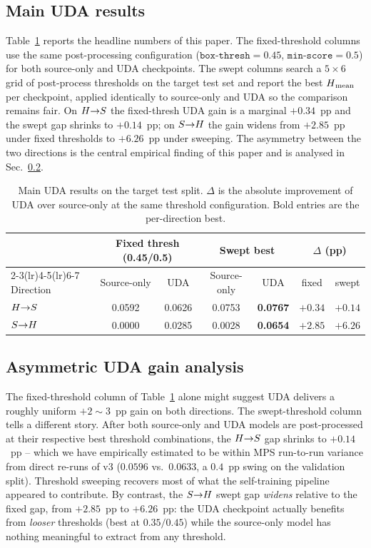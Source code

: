 \subsection{Main UDA results}
\label{sec:exp:main}
Table~\ref{tab:main} reports the headline numbers of this paper.
The fixed-threshold columns use the same post-processing configuration
($\texttt{box-thresh}=0.45$, $\texttt{min-score}=0.5$) for both
source-only and UDA checkpoints. The swept columns search a
$5\times 6$ grid of post-process thresholds on the target test set
and report the best $H\textsubscript{mean}$ per checkpoint, applied identically to
source-only and UDA so the comparison remains fair. On $H{\rightarrow}S$
the fixed-thresh UDA gain is a marginal $+0.34$~pp and the swept
gap shrinks to $+0.14$~pp; on $S{\rightarrow}H$ the gain widens from $+2.85$~pp
under fixed thresholds to $\mathbf{+6.26}$~pp under sweeping. The
asymmetry between the two directions is the central empirical
finding of this paper and is analysed in Sec.~\ref{sec:exp:asym}.

\begin{table}[t]
\centering
\caption{Main UDA results on the target test split. $\Delta$ is the
absolute improvement of UDA over source-only at the same threshold
configuration. Bold entries are the per-direction best.}
\label{tab:main}
\begin{tabular}{lcc cc cc}
\toprule
& \multicolumn{2}{c}{\textbf{Fixed thresh (0.45/0.5)}}
& \multicolumn{2}{c}{\textbf{Swept best}}
& \multicolumn{2}{c}{\textbf{$\Delta$ (pp)}} \\
\cmidrule(lr){2-3}\cmidrule(lr){4-5}\cmidrule(lr){6-7}
Direction & Source-only & UDA & Source-only & UDA & fixed & swept \\
\midrule
$H{\rightarrow}S$ & 0.0592 & 0.0626 & 0.0753 & \textbf{0.0767} & $+0.34$ & $+0.14$ \\
$S{\rightarrow}H$    & 0.0000 & 0.0285 & 0.0028 & \textbf{0.0654} & $+2.85$ & $\mathbf{+6.26}$ \\
\bottomrule
\end{tabular}
\end{table}

\subsection{Asymmetric UDA gain analysis}
\label{sec:exp:asym}
The fixed-threshold column of Table~\ref{tab:main} alone might suggest
UDA delivers a roughly uniform $+2\!\sim\!3$~pp gain on both directions.
The swept-threshold column tells a different story. After both
source-only and UDA models are post-processed at their respective best
threshold combinations, the $H{\rightarrow}S$ gap shrinks to $+0.14$~pp -- which
we have empirically estimated to be within MPS run-to-run variance from
direct re-runs of v3 ($0.0596$ vs.\ $0.0633$, a $0.4$~pp swing on the
validation split). Threshold sweeping recovers most of what the
self-training pipeline appeared to contribute. By contrast, the
$S{\rightarrow}H$ swept gap \emph{widens} relative to the fixed gap, from
$+2.85$~pp to $+6.26$~pp: the UDA checkpoint actually benefits from
\emph{looser} thresholds (best at $0.35/0.45$) while the source-only
model has nothing meaningful to extract from any threshold.

